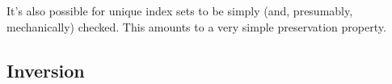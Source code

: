 It's also possible for unique index sets to be simply (and,
presumably, mechanically) checked. This amounts to a very simple
preservation property.

\subsection{Inversion}


